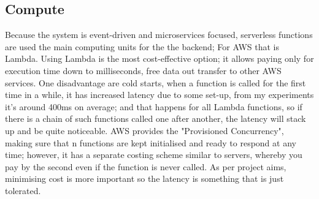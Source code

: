 \subsection{Compute}
Because the system is event-driven and microservices focused, serverless functions are used the main computing units for the the backend; For AWS that is Lambda. Using Lambda is the most cost-effective option; it allows paying only for execution time down to milliseconds, free data out transfer to other AWS services. One disadvantage are cold starts, when a function is called for the first time in a while, it has increased latency due to some set-up, from my experiments it's around 400ms on average; and that happens for all Lambda functions, so if there is a chain of such functions called one after another, the latency will stack up and be quite noticeable. AWS provides the "Provisioned Concurrency", making sure that n functions are kept initialised and ready to respond at any time; however, it has a separate costing scheme similar to servers, whereby you pay by the second even if the function is never called. As per project aims, minimising cost is more important so the latency is something that is just tolerated.

